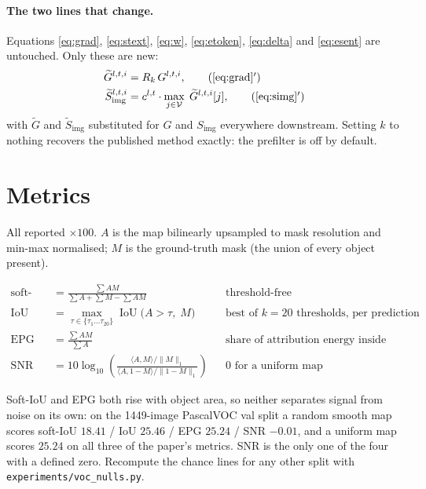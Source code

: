 \documentclass[11pt]{article}
\newcommand{\Vset}{\mathcal{V}}
\begin{document}
\paragraph{The two lines that change.} Equations \eqref{eq:grad},
\eqref{eq:stext}, \eqref{eq:w}, \eqref{eq:etoken}, \eqref{eq:delta} and
\eqref{eq:esent} are untouched. Only these are new:
\begin{align}
\widetilde{G}^{l,t,i}         &= R_k\, G^{l,t,i}, \tag{\ref{eq:grad}$'$}\\
\widetilde{S}^{l,t,i}_{\text{img}} &= c^{l,t} \cdot \max_{j \in \Vset} \; \widetilde{G}^{l,t,i}[j], \tag{\ref{eq:simg}$'$}
\end{align}
with $\widetilde{G}$ and $\widetilde{S}_{\text{img}}$ substituted for $G$ and
$S_{\text{img}}$ everywhere downstream. Setting $k$ to nothing recovers the
published method exactly: the prefilter is off by default.

\section{Metrics}

All reported $\times 100$. $A$ is the map bilinearly upsampled to mask
resolution and min-max normalised; $M$ is the ground-truth mask (the union of
every object present).

\begin{align*}
\text{soft-IoU} &= \frac{\sum AM}{\sum A + \sum M - \sum AM} &&\text{threshold-free}\\
\text{IoU}      &= \max_{\tau \in \{\tau_1 \dots \tau_{20}\}} \operatorname{IoU}\bigl(A > \tau,\; M\bigr) &&\text{best of $k=20$ thresholds, per prediction}\\
\text{EPG}      &= \frac{\sum AM}{\sum A} &&\text{share of attribution energy inside the mask}\\
\text{SNR}      &= 10 \log_{10}\!\left( \frac{\langle A, M\rangle / \lVert M \rVert_1}{\langle A, 1-M\rangle / \lVert 1-M \rVert_1} \right) &&\text{$0$ for a uniform map}
\end{align*}

\noindent Soft-IoU and EPG both rise with object area, so neither separates
signal from noise on its own: on the 1449-image PascalVOC val split a random
smooth map scores soft-IoU $18.41$ / IoU $25.46$ / EPG $25.24$ / SNR $-0.01$, and
a uniform map scores $25.24$ on all three of the paper's metrics. SNR is the only
one of the four with a defined zero. Recompute the chance lines for any other
split with \texttt{experiments/voc\_nulls.py}.
\end{document}
